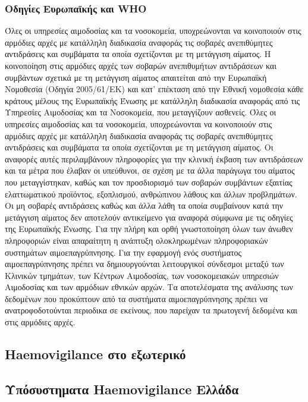 		\subsubsection{Οδηγίες Ευρωπαϊκής και WHO}
		Όλες οι υπηρεσίες αιμοδοσίας και τα νοσοκομεία, υποχρεώνονται να κοινοποιούν στις αρμόδιες αρχές με κατάλληλη διαδικασία αναφοράς τις σοβαρές ανεπιθύμητες αντιδράσεις 	και συμβάματα τα οποία σχετίζονται με τη μετάγγιση αίματος. Η κοινοποίηση στις αρμόδιες αρχές των σοβαρών ανεπιθυμήτων αντιδράσεων και συμβάντων σχετικά με τη μετάγγιση αίματος απαιτείται από την Ευρωπαϊκή Νομοθεσία (Οδηγία 2005/61/ΕΚ) και κατ’ επέκταση από την Εθνική νομοθεσία κάθε κράτους μέλους της Ευρωπαϊκής Ένωσης με κατάλληλη διαδικασία αναφοράς από τις Υπηρεσίες Αιμοδοσίας και τα Νοσοκομεία, που μεταγγίζουν ασθενείς.  
		Όλες οι υπηρεσίες αιμοδοσίας και τα νοσοκομεία, υποχρεώνονται να κοινοποιούν στις αρμόδιες αρχές με κατάλληλη διαδικασία αναφοράς τις σοβαρές ανεπιθύμητες αντιδράσεις και συμβάματα τα οποία σχετίζονται με τη μετάγγιση αίματος. Οι αναφορές αυτές περιλαμβάνουν πληροφορίες για την κλινική έκβαση των αντιδράσεων και τα μέτρα που έλαβαν οι υπεύθυνοι, σε σχέση με τα άλλα παράγωγα του αίματος που μεταγγίστηκαν, καθώς και τον προσδιορισμό των σοβαρών συμβάντων εξαιτίας ελαττωματικού προϊόντος, εξοπλισμού, ανθρώπινου λάθους και άλλων προβλημάτων.\cite{cite-revekka} Οι μη σοβαρές αντιδράσεις καθώς και άλλα λάθη τα οποία συμβαίνουν κατά την μετάγγιση αίματος δεν αποτελούν αντικείμενο για αναφορά σύμφωνα με τις οδηγίες της Ευρωπαϊκής Ένωσης.
		Για την πλήρη και ορθή γνωστοποίηση όλων των άνωθεν πληροφοριών είναι απαραίτητη η ανάπτυξη ολοκληρωμένων πληροφοριακών συστημάτων αιμοεπαγρύπνησης. Για την εφαρμογή ενός συστήματος αιμοεπαγρύπνησης πρέπει να δημιουργούνται λειτουργικοί σύνδεσμοι μεταξύ των Κλινικών τμημάτων, των Κέντρων Αιμοδοσίας, των νοσοκομειακών υπηρεσιών Αιμοδοσίας και των αρμόδιων εθνικών αρχών. Τα αποτελέσματα της ανάλυσης των δεδομένων που προκύπτουν από τα συστήματα αιμοεπαγρύπνησης πρέπει να ανατροφοδοτούνται περιοδικα σε εκείνους, που παρείχαν τα πρωτογενή δεδομένα και στις αρμόδιες αρχές.
		

	\subsection{Haemovigilance στο εξωτερικό}
	\subsection{Υπόσυστηματα Haemovigilance Ελλάδα}
